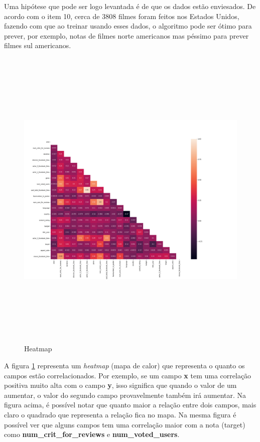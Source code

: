 Uma hipótese que pode ser logo levantada é de que os dados estão enviesados. De acordo com o item 10, cerca de 3808 filmes foram feitos nos Estados Unidos, fazendo com que ao treinar usando esses dados, o algoritmo pode ser ótimo para prever, por exemplo, notas de filmes norte americanos mas péssimo para prever filmes sul americanos.

\begin{figure}[H]
\centering
\includegraphics[height=15cm]{imagens/heatmap.png}
\caption{Heatmap}
\label{heatmap}
\end{figure}

A figura \ref{heatmap} representa um \textit{heatmap} (mapa de calor) que representa o quanto os campos estão correlacionados. Por exemplo, se um campo \textbf{x} tem uma correlação positiva muito alta com o campo \textbf{y}, isso significa que quando o valor de um aumentar, o valor do segundo campo provavelmente também irá aumentar. Na figura acima, é possível notar que quanto maior a relação entre dois campos, mais claro o quadrado que representa a relação fica no mapa. 
Na mesma figura é possível ver que alguns campos tem uma correlação maior com a nota (target) como \textbf{num\_crit\_for\_reviews} e \textbf{num\_voted\_users}. 

